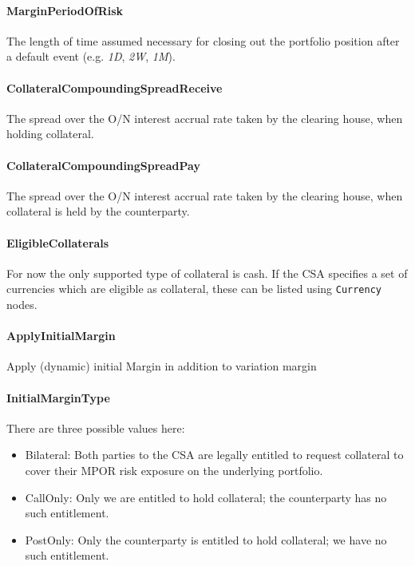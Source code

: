 \paragraph*{MarginPeriodOfRisk} The length of time assumed necessary
for closing out the portfolio position after a default event  (e.g. \emph{1D},
  \emph{2W}, \emph{1M}).

\paragraph*{CollateralCompoundingSpreadReceive} The spread over the O/N
interest accrual rate taken by the clearing house, when holding
collateral.

\paragraph*{CollateralCompoundingSpreadPay} The spread over the O/N
interest accrual rate taken by the clearing house, when collateral is
held by the counterparty.

\paragraph*{EligibleCollaterals} For now the only supported type of
collateral is cash. If the CSA specifies a set of currencies which
are eligible as collateral, these can be listed using
\lstinline!Currency! nodes.

\paragraph*{ApplyInitialMargin} Apply (dynamic) initial Margin in
addition to variation margin

\paragraph*{InitialMarginType} There are three possible values here:
\begin{itemize}
\item Bilateral: Both parties to the CSA are legally entitled to
  request collateral to cover their MPOR risk exposure
  on the underlying portfolio.
\item CallOnly: Only we are entitled to hold collateral; the
  counterparty has no such entitlement.
\item PostOnly: Only the counterparty is entitled to hold collateral;
  we have no such entitlement.
\end{itemize}